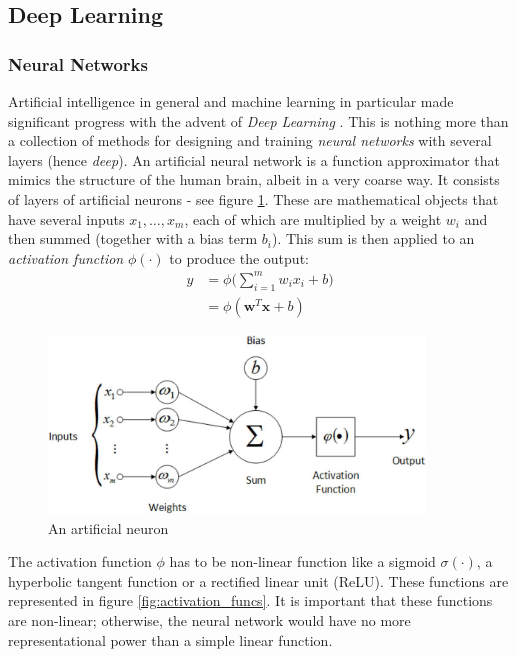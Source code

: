 \subsection{Deep Learning}
\label{sec:deep_learning}

\subsubsection{Neural Networks}
Artificial intelligence in general and machine learning in particular made significant progress with the advent of \emph{Deep Learning} \cite{goodfellow2016deep}. This is nothing more than a collection of methods for designing and training \emph{neural networks} with several layers (hence \emph{deep}). An artificial neural network is a function approximator that mimics the structure of the human brain, albeit in a very coarse way. It consists of layers of artificial neurons - see figure \ref{fig:neuron}. These are mathematical objects that have several inputs $x_1, \ldots, x_m$, each of which are multiplied by a weight $w_i$ and then summed (together with a bias term $b_i$). This sum is then applied to an \emph{activation function} $\phi(\cdot)$ to produce the output:
\begin{equation}
    \begin{split}
    y &= \phi \Big (\sum_{i=1}^{m}w_i x_i + b \Big) \\
      &= \phi (\bm{w}^T \bm{x} + b) 
    \end{split}
\end{equation}

\begin{figure}[htp]
    \centering
    \includegraphics[width=10cm]{images/neuron.jpeg}
    \caption{An artificial neuron}
    \label{fig:neuron}
\end{figure}

The activation function $\phi$ has to be non-linear function like a sigmoid $\sigma(\cdot)$, a hyperbolic tangent function or a rectified linear unit (ReLU). These functions are represented in figure \ref{fig:activation_funcs}. It is important that these functions are non-linear; otherwise, the neural network would have no more representational power than a simple linear function.

